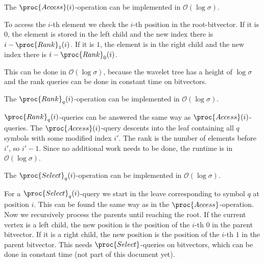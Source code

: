 \begin{Theorem}
  \label{thm:waveletTreeAceess}
  The $\proc{Access}(i)$-operation can be implemented in $\mathcal{O}(\log \sigma)$.
\end{Theorem}

\begin{Proof}
  To access the $i$-th element we check the $i$-th position in the root-bitvector. If it is $0$, the element is stored in the left child and the new index there is $i - \proc{Rank}_1(i)$. If it is $1$, the element is in the right child and the new index there is $i - \proc{Rank}_0(i)$.

  This can be done in $\mathcal{O}(\log\sigma)$, because the wavelet tree has a height of $\log\sigma$ and the rank queries can be done in constant time on bitvectors.
\end{Proof}

\begin{Theorem}
  \label{thm:waveletTreeRank}
  The $\proc{Rank}_q(i)$-operation can be implemented in $\mathcal{O}(\log \sigma)$.
\end{Theorem}

\begin{Proof}
  $\proc{Rank}_q(i)$-queries can be answered the same way as $\proc{Access}(i)$-queries. The $\proc{Access}(i)$-query descents into the leaf containing all $q$ symbols with some modified index $i'$. The rank is the number of elements before $i'$, so $i'-1$. Since no additional work needs to be done, the runtime is in $\mathcal{O}(\log\sigma)$.
\end{Proof}

\begin{Theorem}
  \label{thm:waveletTreeSelect}
  The $\proc{Select}_q(i)$-operation can be implemented in $\mathcal{O}(\log \sigma)$.
\end{Theorem}

\begin{Proof}
  For a $\proc{Select}_q(i)$-query we start in the leave corresponding to symbol $q$ at position $i$. This can be found the same way as in the $\proc{Access}$-operation. Now we recursively process the parents until reaching the root. If the current vertex is a left child, the new position is the position of the $i$-th $0$ in the parent bitvector. If it is a right child, the new position is the position of the $i$-th $1$ in the parent bitvector. This needs $\proc{Select}$-queries on bitvectors, which can be done in constant time (not part of this document yet).
\end{Proof}
